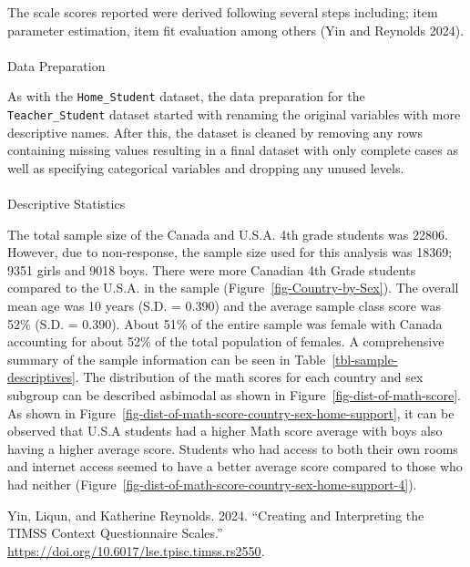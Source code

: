 \documentclass[
  letterpaper,
  DIV=11,
  numbers=noendperiod]{scrartcl}
\makeatletter
\let\oldparagraph\paragraph
\renewcommand{\paragraph}{
    \@ifstar
      \xxxParagraphStar
      \xxxParagraphNoStar
  }
\newcommand{\xxxParagraphStar}[1]{\oldparagraph*{#1}\mbox{}}
\newcommand{\xxxParagraphNoStar}[1]{\oldparagraph{#1}\mbox{}}
\newlength{\cslhangindent}
\newenvironment{CSLReferences}[2] %
 {\begin{list}{}{%
  \setlength{\itemindent}{0pt}
  \setlength{\leftmargin}{0pt}
  \setlength{\parsep}{0pt}
  \ifodd #1
   \setlength{\leftmargin}{\cslhangindent}
   \setlength{\itemindent}{-1\cslhangindent}
  \fi
  \setlength{\itemsep}{#2\baselineskip}}}
 {\end{list}}
\makeatother
\begin{document}
The scale scores reported were derived following several steps
including; item parameter estimation, item fit evaluation among others
(Yin and Reynolds 2024).

\paragraph{Data Preparation}\label{data-preparation-1}

As with the \texttt{Home\_Student} dataset, the data preparation for the
\texttt{Teacher\_Student} dataset started with renaming the original
variables with more descriptive names. After this, the dataset is
cleaned by removing any rows containing missing values resulting in a
final dataset with only complete cases as well as specifying categorical
variables and dropping any unused levels.

\paragraph{Descriptive Statistics}\label{descriptive-statistics-1}

The total sample size of the Canada and U.S.A. 4th grade students was
22806. However, due to non-response, the sample size used for this
analysis was 18369; 9351 girls and 9018 boys. There were more Canadian
4th Grade students compared to the U.S.A. in the sample
(Figure~\ref{fig-Country-by-Sex}). The overall mean age was 10 years
(S.D. = 0.390) and the average sample class score was 52\% (S.D. =
0.390). About 51\% of the entire sample was female with Canada
accounting for about 52\% of the total population of females. A
comprehensive summary of the sample information can be seen in
Table~\ref{tbl-sample-descriptives}. The distribution of the math scores
for each country and sex subgroup can be described asbimodal as shown in
Figure~\ref{fig-dist-of-math-score}. As shown in
Figure~\ref{fig-dist-of-math-score-country-sex-home-support}, it can be
observed that U.S.A students had a higher Math score average with boys
also having a higher average score. Students who had access to both
their own rooms and internet access seemed to have a better average
score compared to those who had neither
(Figure~\ref{fig-dist-of-math-score-country-sex-home-support-4}).

\label{refs}
\begin{CSLReferences}{1}{0}
Yin, Liqun, and Katherine Reynolds. 2024. {``Creating and Interpreting
the TIMSS Context Questionnaire Scales.''}
\url{https://doi.org/10.6017/lse.tpisc.timss.rs2550}.

\end{CSLReferences}
\end{document}
